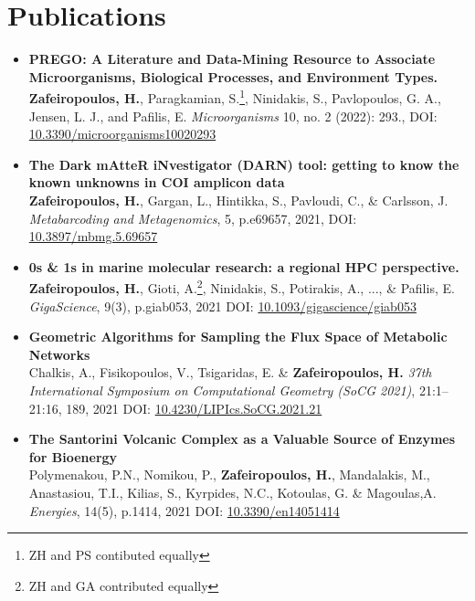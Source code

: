 \section*{Publications}

   \begin{itemize}

      \item{
         \textbf{PREGO: A Literature and Data-Mining Resource to Associate Microorganisms, Biological Processes, and Environment Types.} \\ 
         \textbf{Zafeiropoulos, H.}, Paragkamian, S.\footnote{ZH and PS contibuted equally}, 
         Ninidakis, S., Pavlopoulos, G. A., Jensen, L. J., and Pafilis, E. \textit{Microorganisms} 10, no. 2 (2022): 293.,
         DOI: \href{https://doi.org/10.3390/microorganisms10020293}{10.3390/microorganisms10020293}
      }

      \item{
         \textbf{The Dark mAtteR iNvestigator (DARN) tool: getting to know the known unknowns in COI amplicon data} \\
         \textbf{Zafeiropoulos, H.}, Gargan, L., Hintikka, S., Pavloudi, C., \& Carlsson, J. \textit{Metabarcoding and Metagenomics}, 5, p.e69657, 2021, 
         DOI: \href{https://doi.org/10.3897/mbmg.5.69657}{10.3897/mbmg.5.69657} 
      }

      \item{
         \textbf{0s \& 1s in marine molecular research: a regional HPC perspective.} \\
         \textbf{Zafeiropoulos, H.}, Gioti, A.\footnote{ZH and GA contributed equally}, Ninidakis, S., Potirakis, A., ..., \& Pafilis, E. \textit{GigaScience},  9(3), p.giab053, 2021
         DOI: \href{https://doi.org/10.1093/gigascience/giab053}{10.1093/gigascience/giab053}
      }

      \item{
         \textbf{Geometric Algorithms for Sampling the Flux Space of Metabolic Networks} \\
         Chalkis, A., Fisikopoulos, V., Tsigaridas, E. \& \textbf{Zafeiropoulos, H.} \textit{37th International Symposium on Computational Geometry (SoCG 2021)}, 21:1--21:16, 189, 2021
         DOI: \href{https://drops.dagstuhl.de/opus/volltexte/2021/13820/}{10.4230/LIPIcs.SoCG.2021.21}
      }

      \item{
         \textbf{The Santorini Volcanic Complex as a Valuable Source of Enzymes for Bioenergy} \\ 
         Polymenakou, P.N., Nomikou, P., \textbf{Zafeiropoulos, H.}, Mandalakis, M., Anastasiou, T.I., Kilias, S., Kyrpides, N.C., Kotoulas, G. \& Magoulas,A. \textit{Energies}, 14(5), p.1414, 2021
         DOI: \href{https://doi.org/10.3390/en14051414}{10.3390/en14051414}
      }


\end{itemize}
